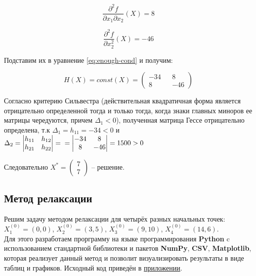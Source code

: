 \begin{equation*}
	\frac{\partial^2 f}{\partial x_1 \partial x_2}(X) = 8
\end{equation*}

\begin{equation*}
	\frac{\partial^2 f}{\partial x^2_2}(X) = - 46
\end{equation*}

Подставим их в уравнение \ref{eq:enough-cond} и получим:

\begin{equation*}
	H(X) = const(X) =
	\begin{pmatrix}
		-34 && 8
		\\
		8 && -46
	\end{pmatrix}
\end{equation*}

Согласно критерию Сильвестра (действительная квадратичная форма является отрицательно определенной тогда и только тогда, когда знаки главных миноров ее матрицы чередуются, причем $\Delta_1 < 0$), полученная матрица Гессе отрицательно определена, т.к $\Delta_1 = h_{11} = -34 < 0$ и $\Delta_2 =%
\begin{vmatrix}%
	h_{11} & h_{12}%
	\\
	h_{21} & h_{22}
\end{vmatrix} = \\
=
\begin{vmatrix}%
	-34 & 8%
	\\
	8 & -46
\end{vmatrix} =1500 > 0$

Следовательно $X^* = \begin{pmatrix}
	7
	\\
	7
\end{pmatrix}$ -- решение.

\subsection{Метод релаксации}

Решим задачу методом релаксации для четырёх разных начальных точек: $X_1^{(0)} = (0, 0)$, $X_2^{(0)} = (3, 5)$, $X_3^{(0)} = (9, 10)$, $X_4^{(0)} = (14, 6)$.\\

Для этого разработаем прорграмму на языке программирования \textbf{Python} c использованием стандартной библиотеки и пакетов \textbf{NumPy}, \textbf{CSV}, \textbf{Matplotlib}, которая реализует данный метод и позволит визуализировать результаты в виде таблиц и графиков.  Исходный код приведён в \hyperref[sec:application]{приложении}.\\

